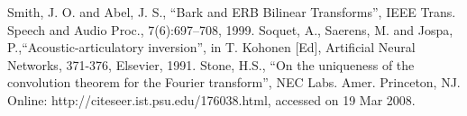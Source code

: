 \documentclass[a4paper]{article}
\begin{document}
\newpage
%
\eightpt

\begin{thebibliography}{10}
 Smith, J. O. and Abel, J. S.,
``Bark and {ERB} Bilinear Transforms'',
IEEE Trans. Speech and Audio Proc., 7(6):697--708, 1999.
 Soquet, A., Saerens, M. and Jospa, P.,``Acoustic-articulatory
inversion'', in T. Kohonen [Ed], Artificial Neural Networks, 371-376,
Elsevier, 1991.
 Stone, H.S., ``On the uniqueness of the convolution theorem
for the Fourier transform'', NEC Labs. Amer. Princeton, NJ.
Online: http://citeseer.ist.psu.edu/176038.html, accessed on 19 Mar 2008.
\end{thebibliography}
\end{document}
